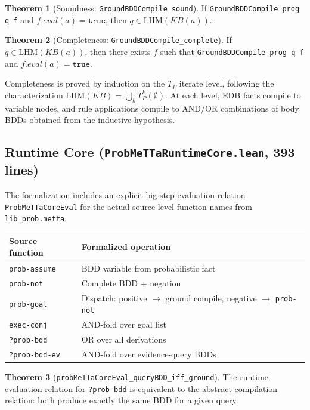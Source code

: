 \documentclass[11pt,a4paper]{article}
\theoremstyle{definition}
\newtheorem{theorem}{Theorem}[section]
\begin{document}
\begin{theorem}[Soundness: \texttt{GroundBDDCompile\_sound}]
If \texttt{GroundBDDCompile prog q f} and $f.\mathit{eval}(a) = \texttt{true}$,
then $q \in \mathrm{LHM}(\mathit{KB}(a))$.
\end{theorem}

\begin{theorem}[Completeness: \texttt{GroundBDDCompile\_complete}]
If $q \in \mathrm{LHM}(\mathit{KB}(a))$, then there exists $f$ such that
\texttt{GroundBDDCompile prog q f} and $f.\mathit{eval}(a) = \texttt{true}$.
\end{theorem}

Completeness is proved by induction on the $T_P$ iterate level, following
the characterization $\mathrm{LHM}(\mathit{KB}) = \bigcup_k T_P^k(\emptyset)$.
At each level, EDB facts compile to variable nodes, and rule applications
compile to AND/OR combinations of body BDDs obtained from the inductive
hypothesis.

\subsection{Runtime Core (\texttt{ProbMeTTaRuntimeCore.lean}, 393 lines)}

The formalization includes an explicit big-step evaluation relation
\texttt{ProbMeTTaCoreEval} for the actual source-level function names
from \texttt{lib\_prob.metta}:

\begin{center}
\begin{tabular}{ll}
\toprule
\textbf{Source function} & \textbf{Formalized operation} \\
\midrule
\texttt{prob-assume} & BDD variable from probabilistic fact \\
\texttt{prob-not} & Complete BDD + negation \\
\texttt{prob-goal} & Dispatch: positive $\to$ ground compile, negative $\to$ \texttt{prob-not} \\
\texttt{exec-conj} & AND-fold over goal list \\
\texttt{?prob-bdd} & OR over all derivations \\
\texttt{?prob-bdd-ev} & AND-fold over evidence-query BDDs \\
\bottomrule
\end{tabular}
\end{center}

\begin{theorem}[\texttt{probMeTTaCoreEval\_queryBDD\_iff\_ground}]
The runtime evaluation relation for \texttt{?prob-bdd} is equivalent to
the abstract compilation relation: both produce exactly the same BDD
for a given query.
\end{theorem}
\end{document}
